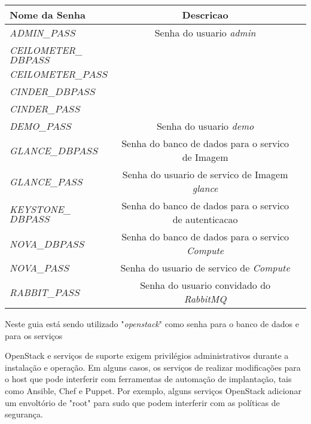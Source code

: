 \documentclass[a4paper]{book}
\begin{document}
				\begin{center}
				\begin{tabular}{|l||c|c|}
				\hline
				\textbf{Nome da Senha}& \textbf{Descricao}\\
				\hline \hline
				\emph{ADMIN\_$PASS$}& Senha do usuario \emph{admin} \\
				\hline \hline
							
				\emph{CEILOMETER\_$DBPASS$} \\
				\hline \hline
				
				\emph{CEILOMETER\_$PASS$} \\
				\hline \hline
				
				\emph{CINDER\_$DBPASS$} \\
				\hline \hline
				
				\emph{CINDER\_$PASS$} \\
				\hline \hline
				
				\emph{DEMO\_$PASS$}& Senha do usuario \emph{demo}\\
				\hline \hline
				
				\emph{GLANCE\_$DBPASS$}& Senha do banco de dados para o servico de Imagem \\
				\hline \hline
				
				\emph{GLANCE\_$PASS$}& Senha do usuario de servico de Imagem \emph{glance} \\
				\hline \hline
				
				\emph{KEYSTONE\_$DBPASS$}& Senha do banco de dados para o servico de autenticacao \\
				\hline \hline
				
				\emph{NOVA\_$DBPASS$}& Senha do banco de dados para o servico \emph{Compute} \\
				\hline \hline
				
				\emph{NOVA\_$PASS$}& Senha do usuario de servico de \emph{Compute} \\
				\hline \hline
				
				\emph{RABBIT\_$PASS$}& Senha do usuario convidado do \emph{RabbitMQ} \\
				\hline
				\end{tabular}
			\end{center}
			Neste guia está sendo utilizado "\emph{openstack}" como senha para o banco de dados e para os serviços 		

		OpenStack e serviços de suporte exigem privilégios administrativos durante a instalação e operação. Em alguns casos, os serviços de realizar modificações para o host que pode interferir com ferramentas de automação de implantação, tais como Ansible, Chef e Puppet. Por exemplo, alguns serviços OpenStack adicionar um envoltório de "root" para sudo que podem interferir com as políticas de segurança.
		
\end{document}
